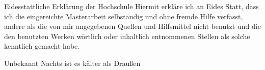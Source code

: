 \begin{aquote}{Eidesstattliche Erklärung der Hochschule}
Hiermit erkläre ich an Eides Statt, dass ich die eingereichte Masterarbeit
				selbständig und ohne fremde Hilfe verfasst, andere als die von mir angegebenen Quellen
				und Hilfsmittel nicht benutzt und die den benutzten Werken wörtlich oder
				inhaltlich entnommenen Stellen als solche kenntlich gemacht habe. 
\end{aquote}

\begin{aquote}{Unbekannt}
Nachts ist es kälter als Draußen
\end{aquote}
